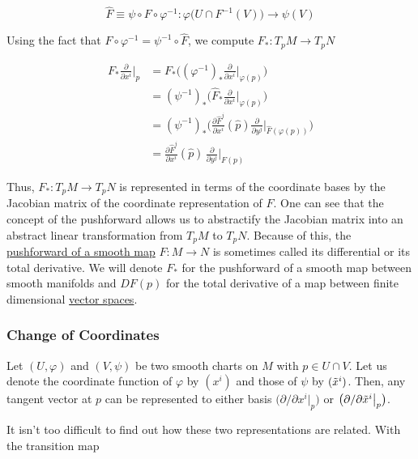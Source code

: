 \documentclass{article}
\begin{document}
      \begin{equation}
        \hat{F} \equiv \psi \circ F \circ \varphi^{-1}: \varphi \big( U \cap F^{-1} (V) \big) \to \psi (V)
      \end{equation}

    Using the fact that $F \circ \varphi^{-1} = \psi^{-1} \circ \hat{F}$, we compute $F_*: T_p M \to T_p N$

    \begin{align*}
      F_* \frac{\partial}{\partial x^i} \bigg|_p & = F_* \bigg( ( \varphi^{-1} )_* \frac{\partial}{\partial x^i} \bigg|_{\varphi(p)} \bigg) \\
      & = (\psi^{-1})_* \bigg( \hat{F}_* \frac{\partial}{\partial x^i} \bigg|_{\varphi(p)}\bigg) \\ 
      & = (\psi^{-1})_* \bigg( \frac{\partial \hat{F}^j}{\partial x^i} (\hat{p}) \frac{\partial}{\partial y^j} \bigg|_{\hat{F}(\varphi(p))} \bigg) \\
      & = \frac{\partial \hat{F}^j}{\partial x^i} (\hat{p})\, \frac{\partial}{\partial y^j} \bigg|_{F(p)} 
    \end{align*}

    Thus, $F_*: T_p M \to T_p N$ is represented in terms of the coordinate bases by the Jacobian matrix of the coordinate representation of $F$. One can see that the concept of the pushforward allows us to abstractify the Jacobian matrix into an abstract linear transformation from $T_p M$ to $T_p N$. Because of this, the \hyperref[def:pushforward-of-a-smooth-map]{pushforward of a smooth map} $F: M \to N$ is sometimes called its differential or its total derivative. We will denote $F_*$ for the pushforward of a smooth map between smooth manifolds and $DF(p)$ for the total derivative of a map between finite dimensional \hyperref[lin-def:vector-space]{vector spaces}. 

    \subsubsection{Change of Coordinates}

      Let $(U, \varphi)$ and $(V, \psi)$ be two smooth charts on $M$ with $p \in U \cap V$. Let us denote the coordinate function of $\varphi$ by $(x^i)$ and those of $\psi$ by $( \Tilde{x}^i)$. Then, any tangent vector at $p$ can be represented to either basis $ \big( \partial/\partial x^i \big|_p \big)$ or $\big( \partial/\partial \Tilde{x}^i \big|_p \big)$. 

      It isn't too difficult to find out how these two representations are related. With the transition map 
\end{document}
